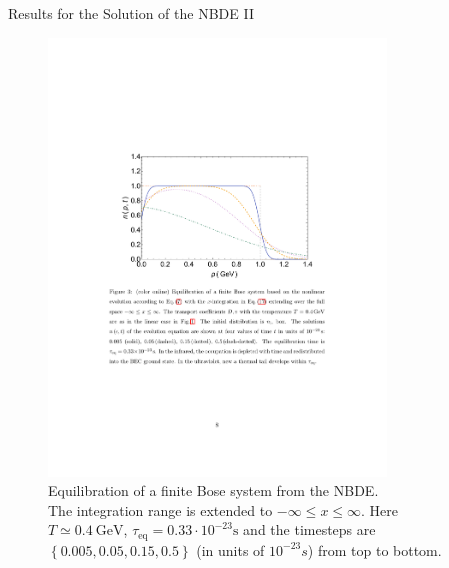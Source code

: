 \begin{frame}{Results for the Solution of the NBDE II}
\begin{figure}[H]
\centering
\includegraphics[width=0.8\textwidth]{figures/nbde_full_range}
\caption{Equilibration of a finite Bose system from the NBDE. \cite{Wolschin2018} \\ 
The integration range is extended to $-\infty \leq x \leq \infty$. Here $T\simeq 0.4\ \mathrm{GeV}$, $\tau_{\mathrm{eq}} =  0.33\cdot 10^{-23} \mathrm{s}$ and the timesteps are $\left\{0.005, 0.05, 0.15,0.5\right\}$ (in units of $10^{-23}s$) from top to bottom.}
\end{figure}
\end{frame}


